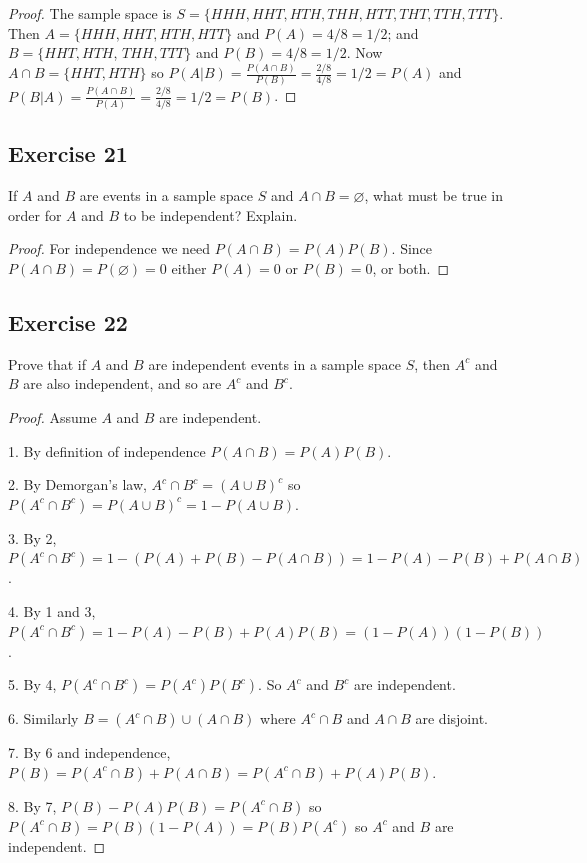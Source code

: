 \documentclass[14pt]{extarticle}
\newcommand{\es}{\varnothing}
\begin{document}
\begin{proof}
The sample space is \(S = \{HHH, HHT, HTH, THH, HTT, THT, TTH, TTT\}\). Then \(A = \{HHH, HHT, HTH, HTT\}\) and \(P(A) = 4/8 
= 1/2\); and \(B = \{HHT, HTH\), \(THH, TTT\}\) and \(P(B) = 4/8 = 1/2\). Now \(A \cap B = \{HHT, HTH\}\) so \(P(A|B) = 
\frac{P(A \cap B)}{P(B)} = \frac{2/8}{4/8} = 1/2 = P(A)\) and \(P(B|A) = \frac{P(A \cap B)}{P(A)} = \frac{2/8}{4/8} = 1/2 = 
P(B)\).
\end{proof}

\subsection{Exercise 21}
If \(A\) and \(B\) are events in a sample space \(S\) and \(A \cap B = \es\), what must be true in order for \(A\) and \(B\) 
to be independent? Explain.

\begin{proof}
For independence we need \(P(A \cap B) = P(A)P(B)\). Since \(P(A \cap B) = P(\es) = 0\) either \(P(A) = 0\) or \(P(B) = 
0\), or both.
\end{proof}

\subsection{Exercise 22}
Prove that if \(A\) and \(B\) are independent events in a sample space \(S\), then \(A^c\) and \(B\) are also 
independent, and so are \(A^c\) and \(B^c\).

\begin{proof}
Assume \(A\) and \(B\) are independent.

1. By definition of independence \(P(A \cap B) = P(A)P(B)\).

2. By Demorgan's law, \(A^c \cap B^c = (A \cup B)^c\) so \(P(A^c \cap B^c) = P(A \cup B)^c = 1 - P(A \cup B)\).

3. By 2, \(P(A^c \cap B^c) = 1 - (P(A) + P(B) - P(A \cap B)) = 1 - P(A) - P(B) + P(A \cap B)\).

4. By 1 and 3, \(P(A^c \cap B^c) = 1 - P(A) - P(B) + P(A)P(B) = (1-P(A))(1-P(B))\).

5. By 4, \(P(A^c \cap B^c) = P(A^c)P(B^c)\). So \(A^c\) and \(B^c\) are independent.

6. Similarly \(B = (A^c \cap B) \cup (A \cap B)\) where \(A^c \cap B\) and \(A \cap B\) are disjoint.

7. By 6 and independence, \(P(B) = P(A^c \cap B) + P(A \cap B) = P(A^c \cap B) + P(A)P(B)\).

8. By 7, \(P(B) - P(A)P(B) = P(A^c \cap B)\) so \(P(A^c \cap B) = P(B)(1-P(A)) = P(B)P(A^c)\) so \(A^c\) and \(B\) are
independent.
\end{proof}
\end{document}
